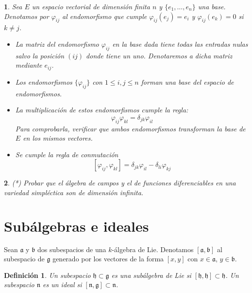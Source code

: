 \documentclass[a4paper,draft,12pt]{article}
\newtheorem{defi}{Definición}[section]%
\newtheorem{pro1}{}%
\newenvironment{pro}{\begin{pro1} \rm} {\end{pro1}}
\newcommand{\g}{\mathfrak{g}}%
\newcommand{\df}[1]{\textsf{\color{blue}#1}}
\begin{document}
\begin{pro}

Sea $E$ un espacio vectorial de dimensión finita $n$ y $\{e_1, \dots,e_n\}$ una base.  Denotamos por $\varphi_{ij}$ al endomorfismo que cumple $\varphi_{ij}(e_j)=e_i$ y $\varphi_{ij}(e_k)=0$ si $k \neq j$.

\begin{itemize}

\item La matriz del endomorfismo $\varphi_{ij}$ en la base dada tiene todas las entradas nulas salvo la posición $(ij)$ donde tiene un uno.  Denotaremos a dicha matriz mediante $e_{ij}$.

\item Los endomorfismos $\{\varphi_{ij}\}$ con $ 1 \leq i,j\leq n$ forman una base del espacio de endomorfismos.

\item La multiplicación de estos endomorfismos cumple la regla:
\[
\varphi_{ij} \varphi_{kl} = \delta_{jk} \varphi_{il}
\]
Para comprobarla, verificar que ambos endomorfismos transforman la base de $E$ en los mismos  vectores.

\item Se cumple la regla de conmutación
\[
[\varphi_{ij}, \varphi_{kl}]= \delta_{jk}\varphi_{il}-\delta_{li} \varphi_{kj}
\]

\end{itemize}

\end{pro}




\begin{pro}
   (*)     Probar que el álgebra de campos y el de funciones diferenciables en una variedad simpléctica son de dimensión infinita. 
\end{pro}


\newpage

\section{Subálgebras e ideales}

        Sean   $\mathfrak{a}$  y  $\mathfrak{b}$  dos subespacios de una  $k$-álgebra de Lie. Denotamos $[\mathfrak{a},\mathfrak{b}]$ al subespacio de $\g$ generado por los vectores de la forma $[x,y]$ con $ x\in \mathfrak{a}$, $  y \in  \mathfrak{b}$.

\begin{defi}

Un subespacio   $\mathfrak{h} \subset  \g$  es una \df{subálgebra de Lie}   si   $[\mathfrak{h},\mathfrak{h}] \subset  \mathfrak{h}$.  
Un subespacio  $\mathfrak{n}$  es un \df{ideal}    si $[\mathfrak{n},\g] \subset   \mathfrak{n}$.

\end{defi}
\end{document}
